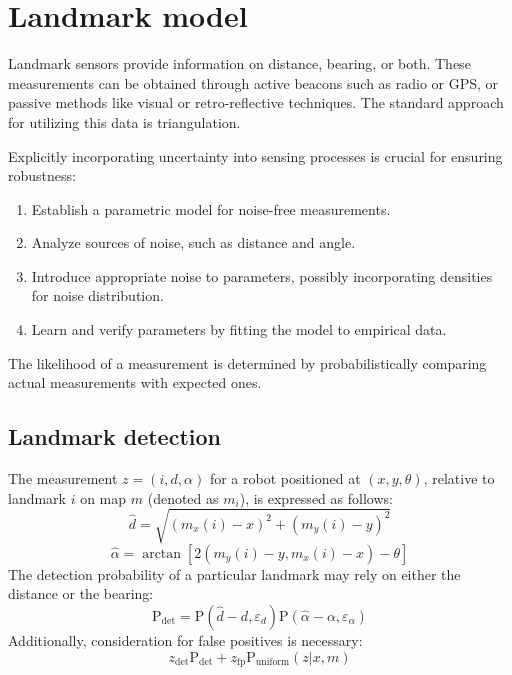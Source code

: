 \section{Landmark model}

Landmark sensors provide information on distance, bearing, or both. 
These measurements can be obtained through active beacons such as radio or GPS, or passive methods like visual or retro-reflective techniques.
The standard approach for utilizing this data is triangulation.

Explicitly incorporating uncertainty into sensing processes is crucial for ensuring robustness:
\begin{enumerate}
    \item Establish a parametric model for noise-free measurements.
    \item Analyze sources of noise, such as distance and angle.
    \item Introduce appropriate noise to parameters, possibly incorporating densities for noise distribution.
    \item Learn and verify parameters by fitting the model to empirical data.
\end{enumerate}
The likelihood of a measurement is determined by probabilistically comparing actual measurements with expected ones.

\subsection{Landmark detection}
The measurement $z = (i, d, \alpha)$ for a robot positioned at $(x, y, \theta)$, relative to landmark $i$ on map $m$ (denoted as $m_i$), is expressed as follows:
\[\hat{d}=\sqrt{{\left(m_x(i)-x\right)}^2+{\left(m_y(i)-y\right)}^2}\]
\[\hat{\alpha}=\arctan\left[2(m_y(i)-y,m_x(i)-x)-\theta\right]\]
The detection probability of a particular landmark may rely on either the distance or the bearing:
\[\text{P}_{\text{det}}=\text{P}(\hat{d}-d,\varepsilon_d)\text{P}(\hat{\alpha}-\alpha,\varepsilon_\alpha)\]
Additionally, consideration for false positives is necessary:
\[z_{\text{det}}\text{P}_{\text{det}}+z_{\text{fp}}\text{P}_{\text{uniform}}(z|x,m)\]